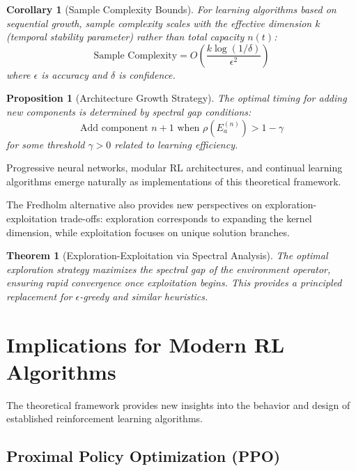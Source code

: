 \documentclass[11pt]{article}
\newtheorem{theorem}{Theorem}
\newtheorem{proposition}{Proposition}
\newtheorem{corollary}{Corollary}
\begin{document}
\begin{corollary}[Sample Complexity Bounds]
For learning algorithms based on sequential growth, sample complexity scales with the effective dimension $k$ (temporal stability parameter) rather than total capacity $n(t)$:
\begin{equation}
\text{Sample Complexity} = O\left(\frac{k \log(1/\delta)}{\epsilon^2}\right)
\end{equation}
where $\epsilon$ is accuracy and $\delta$ is confidence.
\end{corollary}

\begin{proposition}[Architecture Growth Strategy]
The optimal timing for adding new components is determined by spectral gap conditions:
\begin{equation}
\text{Add component } n+1 \text{ when } \rho(E_a^{(n)}) > 1 - \gamma
\end{equation}
for some threshold $\gamma > 0$ related to learning efficiency.
\end{proposition}

Progressive neural networks, modular RL architectures, and continual learning algorithms emerge naturally as implementations of this theoretical framework.

The Fredholm alternative also provides new perspectives on exploration-exploitation trade-offs: exploration corresponds to expanding the kernel dimension, while exploitation focuses on unique solution branches.

\begin{theorem}[Exploration-Exploitation via Spectral Analysis]
The optimal exploration strategy maximizes the spectral gap of the environment operator, ensuring rapid convergence once exploitation begins. This provides a principled replacement for $\epsilon$-greedy and similar heuristics.
\end{theorem}

\section{Implications for Modern RL Algorithms}

The theoretical framework provides new insights into the behavior and design of established reinforcement learning algorithms.

\subsection{Proximal Policy Optimization (PPO)}
\end{document}
